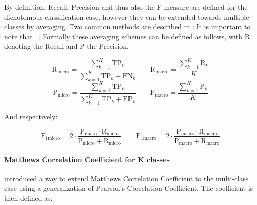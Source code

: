 By definition, Recall, Precision and thus also the F-measure are defined for the dichotomous classification case, however they can be extended towards multiple classes by averaging. Two common methods are described in \cite[Chapter 13.6, p.~280]{Manning:2008aa}: 
It is important to note that ~\cite[Chapter 13.6, p.~280]{Manning:2008aa}. Formally these averaging schemes can be defined as follows, with R denoting the Recall and P the Precision.

\begin{equation}
  \text{R}_{\text{micro}} = \frac{\sum_{k=1}^K \text{TP}_k }{ \sum_{k=1}^K \text{TP}_k + \text{FN}_k } \qquad
  \text{R}_{\text{macro}} = \frac{\sum_{k=1}^K \text{R}_k }{ K }
\end{equation}
\begin{equation}
  \text{P}_{\text{micro}} = \frac{\sum_{k=1}^K \text{TP}_k }{ \sum_{k=1}^K \text{TP}_k + \text{FP}_k } \qquad
  \text{P}_{\text{macro}} = \frac{\sum_{k=1}^K \text{P}_k }{ K }
\end{equation}

And respectively:

\begin{equation}
  \text{F}_{1 \text{micro}} = 2 \cdot \frac{\text{P}_{\text{micro}} \cdot \text{R}_{\text{micro}} }{\text{P}_{\text{micro}} + \text{R}_{\text{micro}} } \qquad
  \text{F}_{1 \text{macro}} = 2 \cdot \frac{\text{P}_{\text{macro}} \cdot \text{R}_{\text{macro}} }{\text{P}_{\text{macro}} + \text{R}_{\text{macro}} }
\end{equation}

\paragraph{Matthews Correlation Coefficient for K classes}
\label{par:Matthews Correlation Coefficient for K classes}

\cite{Gorodkin:2004aa} introduced a way to extend Matthews Correlation Coefficient to the multi-class case using a generalization of Pearson’s Correlation Coefficient. The coefficient is then defined as:

